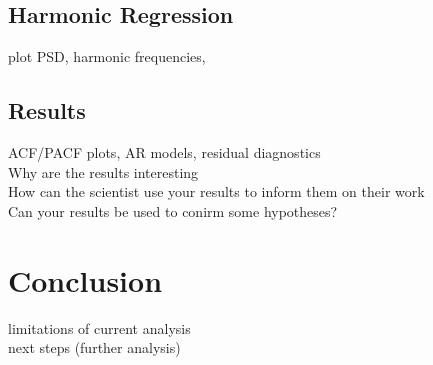\documentclass[12pt]{article}
\begin{document}
\subsection{Harmonic Regression}
plot PSD, harmonic frequencies, 

\subsection{Results}
ACF/PACF plots, AR models, residual diagnostics\\
Why are the results interesting\\
How can the scientist use your results to inform them on their work\\
Can your results be used to conirm some hypotheses?\\


\section{Conclusion}
limitations of current analysis\\
next steps (further analysis)
\end{document}
